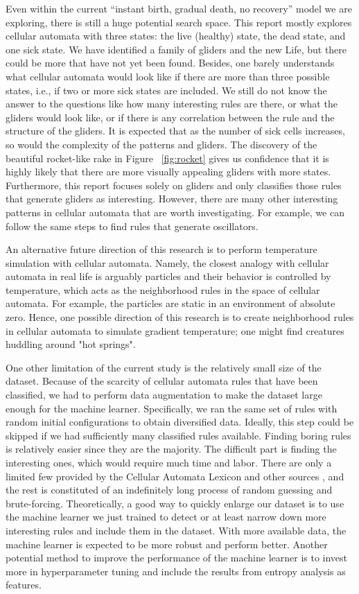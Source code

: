 \documentclass[12pt]{article}
\numberwithin{figure}{section} %
\begin{document}
Even within the current “instant birth, gradual death, no recovery” model we are exploring, there is still a huge potential search space. This report mostly explores cellular automata with three states: the live (healthy) state, the dead state, and one sick state. We have identified a family of gliders and the new Life, but there could be more that have not yet been found. Besides, one barely understands what cellular automata would look like if there are more than three possible states, i.e., if two or more sick states are included. We still do not know the answer to the questions like how many interesting rules are there, or what the gliders would look like, or if there is any correlation between the rule and the structure of the gliders. It is expected that as the number of sick cells increases, so would the complexity of the patterns and gliders. The discovery of the beautiful rocket-like rake in Figure ~\ref{fig:rocket} gives us confidence that it is highly likely that there are more visually appealing gliders with more states. Furthermore, this report focuses solely on gliders and only classifies those rules that generate gliders as interesting. However, there are many other interesting patterns in cellular automata that are worth investigating. For example, we can follow the same steps to find rules that generate oscillators. 

An alternative future direction of this research is to perform temperature simulation with cellular automata. Namely, the closest analogy with cellular automata in real life is arguably particles and their behavior is controlled by temperature, which acts as the neighborhood rules in the space of cellular automata. For example, the particles are static in an environment of absolute zero. Hence, one possible direction of this research is to create neighborhood rules in cellular automata to simulate gradient temperature; one might find creatures huddling around "hot springs". 

One other limitation of the current study is the relatively small size of the dataset. Because of the scarcity of cellular automata rules that have been classified, we had to perform data augmentation to make the dataset large enough for the machine learner. Specifically, we ran the same set of rules with random initial configurations to obtain diversified data. Ideally, this step could be skipped if we had sufficiently many classified rules available. Finding boring rules is relatively easier since they are the majority. The difficult part is finding the interesting ones, which would require much time and labor. There are only a limited few provided by the Cellular Automata Lexicon and other sources \cite{Lexicon}, and the rest is constituted of an indefinitely long process of random guessing and brute-forcing. Theoretically, a good way to quickly enlarge our dataset is to use the machine learner we just trained to detect or at least narrow down more interesting rules and include them in the dataset. With more available data, the machine learner is expected to be more robust and perform better. Another potential method to improve the performance of the machine learner is to invest more in hyperparameter tuning and include the results from entropy analysis as features. 
\end{document}
